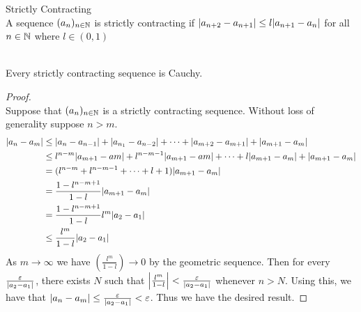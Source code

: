 \documentclass[a4paper]{article}
\begin{document}
\begin{defn}{Strictly Contracting}{}\\ A sequence $(a_n)_{n\in\mathbb{N}}$ is strictly contracting if $\abs{a_{n+2}-a_{n+1}}\leq l\abs{a_{n+1}-a_n}$ for all $n\in\mathbb{N}$ where $l\in(0,1)$
\end{defn}

\begin{thm}{}{}\\ Every strictly contracting sequence is Cauchy. 
\begin{proof}\\ Suppose that $(a_n)_{n\in\mathbb{N}}$ is a strictly contracting sequence. Without loss of generality suppose $n>m$. 
\begin{align*}
\abs{a_n-a_m}&\leq\abs{a_n-a_{n-1}}+\abs{a_{n_1}-a_{n-2}}+\dots+\abs{a_{m+2}-a_{m+1}}+\abs{a_{m+1}-a_m} \\
&\leq l^{n-m}\abs{a_{m+1}-a{m}}+l^{n-m-1}\abs{a_{m+1}-a{m}}+\dots+l\abs{a_{m+1}-a_m}+\abs{a_{m+1}-a_m} \\
&=(l^{n-m}+l^{n-m-1}+\dots+l+1)\abs{a_{m+1}-a_m} \\
&=\frac{1-l^{n-m+1}}{1-l}\abs{a_{m+1}-a_m} \\
&=\frac{1-l^{n-m+1}}{1-l}l^m\abs{a_2-a_1} \\
&\leq\frac{l^m}{1-l}\abs{a_2-a_1}
\end{align*}
As $m\to\infty$ we have $\left(\frac{l^m}{1-l}\right)\to0$ by the geometric sequence. Then for every $\frac{\varepsilon}{\abs{a_2-a_1}}$, there exists $N$ such that $\abs{\frac{l^m}{1-l}}<\frac{\varepsilon}{\abs{a_2-a_1}}$ whenever $n>N$. Using this, we have that $\abs{a_n-a_m}\leq\frac{\varepsilon}{\abs{a_2-a_1}}<\varepsilon$. Thus we have the desired result. 
\end{proof}
\end{thm}
\end{document}
